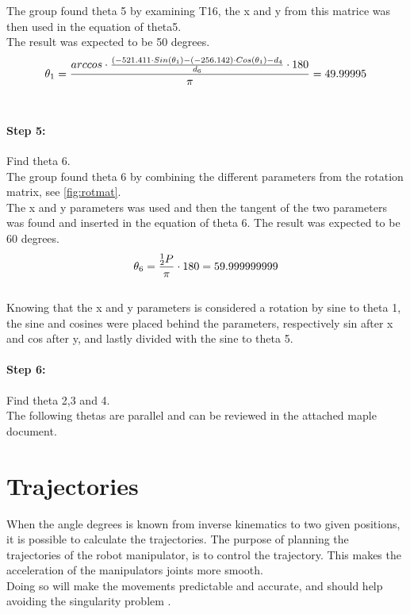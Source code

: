 The group found theta 5 by examining T16, the x and y from this matrice was then used in the equation of theta5.\\
The result was expected to be 50 degrees.
\begin{equation}
\centering
\large\theta_1 =\frac{arccos\cdot\frac{(-521.411\cdot Sin(\theta_1)-(-256.142)\cdot Cos(\theta_1)-d_4}{d_6}\cdot 180}{\pi}=49.99995
\end{equation}\\


\paragraph{Step 5:} Find theta 6.\\

The group found theta 6 by combining the different parameters from the rotation matrix, see \ref{fig:rotmat}.\\
The x and y parameters was used and then the tangent of the two parameters was found and inserted in the equation of theta 6.
The result was expected to be 60 degrees.\\

\begin{equation}
\centering
\theta_6 = \frac{^1_2 P}{\pi} \cdot 180 = 59.999999999
\label{}
\end{equation}\\

Knowing that the x and y parameters is considered a rotation by sine to theta 1, the sine and cosines were placed behind the parameters, respectively sin after x and cos after y, and lastly divided with the sine to theta 5.

\paragraph{Step 6:} Find theta 2,3 and 4.\\

The following thetas are parallel and can be reviewed in the attached maple document.\\


\section{Trajectories}
When the angle degrees is known from inverse kinematics to two given positions, it is possible to calculate the trajectories. The purpose of planning the trajectories of the robot manipulator, is to control the trajectory. This makes the acceleration of the manipulators joints more smooth.\\
Doing so will make the movements predictable and accurate, and should help avoiding the singularity problem \cite{Trajectory}. 


